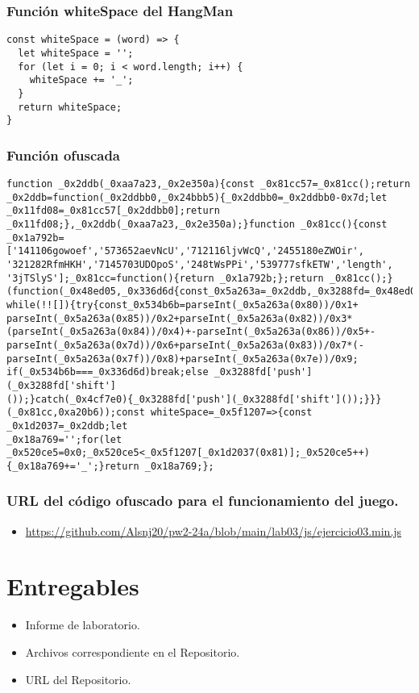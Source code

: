\documentclass{article}
\begin{document}
\subsubsection{Función whiteSpace del HangMan}
\begin{lstlisting}[style=ascii-tree]
const whiteSpace = (word) => {
  let whiteSpace = '';
  for (let i = 0; i < word.length; i++) {
    whiteSpace += '_';
  }
  return whiteSpace;
}
\end{lstlisting}
\subsubsection{Función ofuscada}
\begin{lstlisting}[style=ascii-tree]
function _0x2ddb(_0xaa7a23,_0x2e350a){const _0x81cc57=_0x81cc();return 
_0x2ddb=function(_0x2ddbb0,_0x24bbb5){_0x2ddbb0=_0x2ddbb0-0x7d;let 
_0x11fd08=_0x81cc57[_0x2ddbb0];return 
_0x11fd08;},_0x2ddb(_0xaa7a23,_0x2e350a);}function _0x81cc(){const 
_0x1a792b=['141106gowoef','573652aevNcU','712116ljvWcQ','2455180eZWOir',
'321282RfmHKH','7145703UDOpoS','248tWsPPi','539777sfkETW','length',
'3jTSlyS'];_0x81cc=function(){return _0x1a792b;};return _0x81cc();}
(function(_0x48ed05,_0x336d6d{const_0x5a263a=_0x2ddb,_0x3288fd=_0x48ed05();
while(!![]){try{const_0x534b6b=parseInt(_0x5a263a(0x80))/0x1+
parseInt(_0x5a263a(0x85))/0x2+parseInt(_0x5a263a(0x82))/0x3*
(parseInt(_0x5a263a(0x84))/0x4)+-parseInt(_0x5a263a(0x86))/0x5+-
parseInt(_0x5a263a(0x7d))/0x6+parseInt(_0x5a263a(0x83))/0x7*(-
parseInt(_0x5a263a(0x7f))/0x8)+parseInt(_0x5a263a(0x7e))/0x9;
if(_0x534b6b===_0x336d6d)break;else _0x3288fd['push'](_0x3288fd['shift']
());}catch(_0x4cf7e0){_0x3288fd['push'](_0x3288fd['shift']());}}}
(_0x81cc,0xa20b6));const whiteSpace=_0x5f1207=>{const _0x1d2037=_0x2ddb;let 
_0x18a769='';for(let _0x520ce5=0x0;_0x520ce5<_0x5f1207[_0x1d2037(0x81)];_0x520ce5++)
{_0x18a769+='_';}return _0x18a769;};
\end{lstlisting}
\subsubsection{URL del código ofuscado para el funcionamiento del juego.}
\begin{itemize}
	\item \url{https://github.com/Alsnj20/pw2-24a/blob/main/lab03/js/ejercicio03.min.js}
\end{itemize}
\section{Entregables}
\begin{itemize}
    \item Informe de laboratorio.
    \item Archivos correspondiente en el Repositorio.
    \item URL del Repositorio.
\end{itemize}
\end{document}
